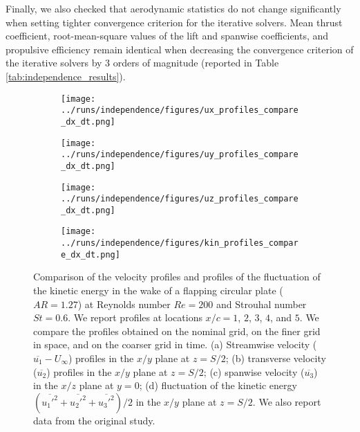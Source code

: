 Finally, we also checked that aerodynamic statistics do not change significantly when setting tighter convergence criterion for the iterative solvers.
Mean thrust coefficient, root-mean-square values of the lift and spanwise coefficients, and propulsive efficiency remain identical when decreasing the convergence criterion of the iterative solvers by 3 orders of magnitude (reported in Table \ref{tab:independence_results}).

\begin{figure}
  \centering
  \begin{subfigure}[c]{0.45\textwidth}
    \centering
    \texttt{[image: ../runs/independence/figures/ux\_profiles\_compare\_dx\_dt.png]}
    \caption{}
  \end{subfigure}
  \hfill
  \begin{subfigure}[c]{0.45\textwidth}
    \centering
    \texttt{[image: ../runs/independence/figures/uy\_profiles\_compare\_dx\_dt.png]}
    \caption{}
  \end{subfigure}
  \vspace{1cm}
  \begin{subfigure}[c]{0.45\textwidth}
    \centering
    \texttt{[image: ../runs/independence/figures/uz\_profiles\_compare\_dx\_dt.png]}
    \caption{}
  \end{subfigure}
  \hfill
  \begin{subfigure}[c]{0.45\textwidth}
    \centering
    \texttt{[image: ../runs/independence/figures/kin\_profiles\_compare\_dx\_dt.png]}
    \caption{}
  \end{subfigure}
  \caption{Comparison of the velocity profiles and profiles of the fluctuation of the kinetic energy in the wake of a flapping circular plate ($AR = 1.27$) at Reynolds number $Re = 200$ and Strouhal number $St = 0.6$. We report profiles at locations $x / c = 1$, $2$, $3$, $4$, and $5$. We compare the profiles obtained on the nominal grid, on the finer grid in space, and on the coarser grid in time. (a) Streamwise velocity ($\overline{u_1} - U_\infty$) profiles in the $x/y$ plane at $z = S / 2$; (b) transverse velocity ($\overline{u_2}$) profiles in the $x/y$ plane at $z = S / 2$; (c) spanwise velocity ($\overline{u_3}$) in the $x/z$ plane at $y = 0$; (d) fluctuation of the kinetic energy $( \overline{{u_1'}^2} + \overline{{u_2'}^2} + \overline{{u_3'}^2} ) / 2$ in the $x/y$ plane at $z = S / 2$. We also report data from the original study.\supercite{li_dong_2016}}
  \label{fig:independence_profiles}
\end{figure}

